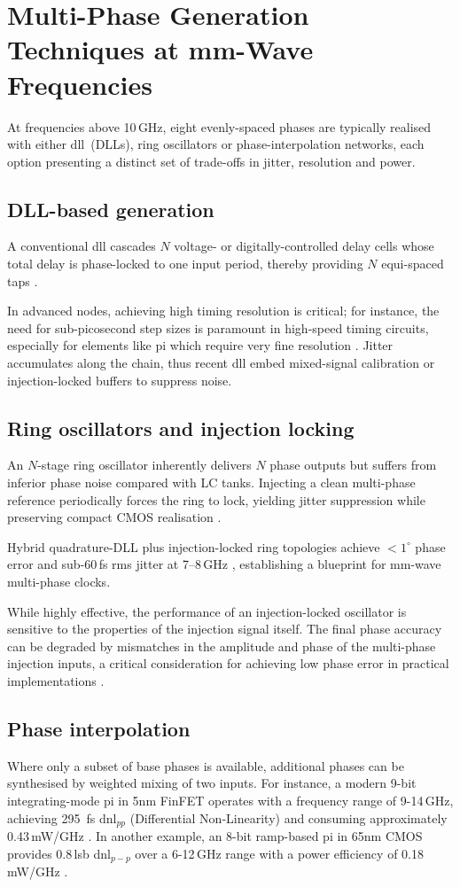 
\section{Multi-Phase Generation Techniques at mm-Wave Frequencies}
At frequencies above 10\,GHz, eight evenly-spaced phases are typically realised with either \gls{dll}~(DLLs), ring oscillators or phase-interpolation networks, each option presenting a distinct set of trade-offs in jitter, resolution and power.

\subsection{DLL-based generation}
A conventional \gls{dll} cascades $N$ voltage- or digitally-controlled delay cells whose total delay is phase-locked to one input period, thereby providing $N$ equi-spaced taps \cite{Wang2021JSSC}.

In advanced nodes, achieving high timing resolution is critical; for instance, the need for sub-picosecond step sizes is paramount in high-speed timing circuits, especially for elements like \gls{pi} which require very fine resolution \cite{Mishra2022ISSCC}.
Jitter accumulates along the chain, thus recent \gls{dll} embed mixed-signal calibration or injection-locked buffers to suppress noise.

\subsection{Ring oscillators and injection locking}
An $N$-stage ring oscillator inherently delivers $N$ phase outputs but suffers from inferior phase noise compared with LC tanks. Injecting a clean multi-phase reference periodically forces the ring to lock, yielding jitter suppression while preserving compact CMOS realisation \cite{Wang2021JSSC}.

Hybrid quadrature-DLL plus injection-locked ring topologies achieve $<\!1^{\circ}$ phase error and sub-60\,fs rms jitter at 7–8\,GHz \cite{Wang2021JSSC}, establishing a blueprint for mm-wave multi-phase clocks.

While highly effective, the performance of an injection-locked oscillator is sensitive to the properties of the injection signal itself. The final phase accuracy can be degraded by mismatches in the amplitude and phase of the multi-phase injection inputs, a critical consideration for achieving low phase error in practical implementations \cite{Wang2025ArXiv}.

\subsection{Phase interpolation}
Where only a subset of base phases is available, additional phases can be synthesised by weighted mixing of two inputs.
For instance, a modern 9-bit integrating-mode \gls{pi} in 5nm FinFET operates with a frequency range of 9-14\,GHz, achieving \SI{295}{\femto\second} \gls{dnl}$_{pp}$ (Differential Non-Linearity) and consuming approximately 0.43\,mW/GHz \cite{Mishra2022ISSCC}. In another example, an 8-bit ramp-based \gls{pi} in 65nm CMOS provides 0.8\,\gls{lsb} \gls{dnl}$_{p-p}$ over a 6-12\,GHz range with a power efficiency of 0.18\,mW/GHz \cite{Mohapatra2024ISSCC}.

